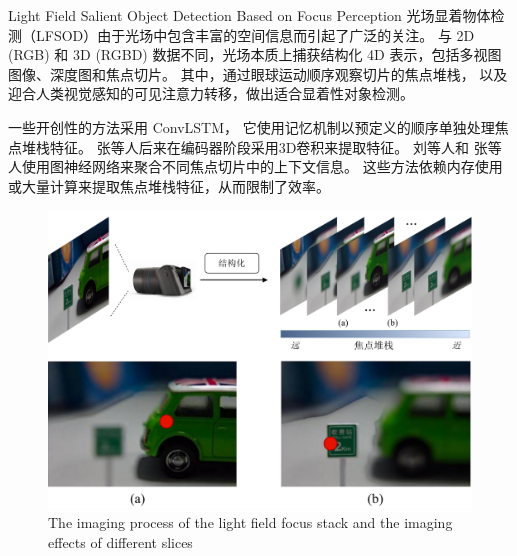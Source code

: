 %
%
%
%
%
%
%
%




{Light Field Salient Object Detection Based on Focus Perception}
\label{chap:part3}
%
%
光场显着物体检测（LFSOD）由于光场中包含丰富的空间信息而引起了广泛的关注。
与 2D (RGB) 和 3D (RGBD) 数据不同，光场本质上捕获结构化 4D 表示，包括多视图图像、深度图和焦点切片。 其中，通过眼球运动顺序观察切片的焦点堆栈，
以及迎合人类视觉感知的可见注意力转移，做出适合显着性对象检测。







一些开创性的方法采用 ConvLSTM，
它使用记忆机制以预定义的顺序单独处理焦点堆栈特征。
张等人后来在编码器阶段采用3D卷积来提取特征。
刘等人和
张等人使用图神经网络来聚合不同焦点切片中的上下文信息。 
这些方法依赖内存使用或大量计算来提取焦点堆栈特征，从而限制了效率。




\begin{figure}[!ht]
	\centering
	\includegraphics[width=0.85\linewidth]{figures/chapter3/cpt3_idea.pdf}
	{The imaging process of the light field focus stack and the imaging effects of different slices}
	\label{figure:cpt3:idea}
\end{figure}




